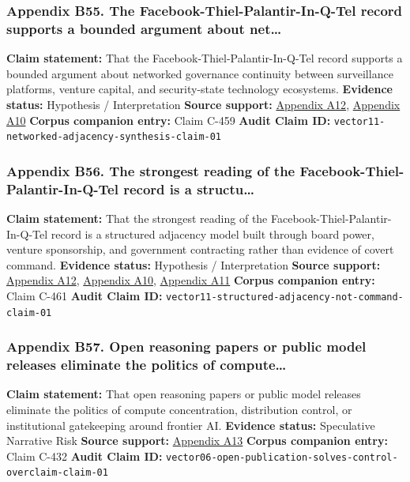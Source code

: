 \documentclass[
  american,
  11pt,
  letterpaper,
]{article}
\begin{document}
\subsubsection{Appendix B55. The Facebook-Thiel-Palantir-In-Q-Tel record
supports a bounded argument about
net\ldots{}}\label{appendix-b55-the-facebook-thiel-palantir-in-q-tel-record-supports-a-bounded-argument-about-net}

\textbf{Claim statement:} That the Facebook-Thiel-Palantir-In-Q-Tel
record supports a bounded argument about networked governance continuity
between surveillance platforms, venture capital, and security-state
technology ecosystems. \textbf{Evidence status:} Hypothesis /
Interpretation \textbf{Source support:}
\hyperref[appendix-a12-meta-platforms-inc-2022-definitive-proxy-statement]{Appendix
A12}, \hyperref[appendix-a10-in-q-tel]{Appendix A10} \textbf{Corpus
companion entry:} Claim C-459 \textbf{Audit Claim ID:}
\texttt{vector11-networked-adjacency-synthesis-claim-01}

\subsubsection{Appendix B56. The strongest reading of the
Facebook-Thiel-Palantir-In-Q-Tel record is a
structu\ldots{}}\label{appendix-b56-the-strongest-reading-of-the-facebook-thiel-palantir-in-q-tel-record-is-a-structu}

\textbf{Claim statement:} That the strongest reading of the
Facebook-Thiel-Palantir-In-Q-Tel record is a structured adjacency model
built through board power, venture sponsorship, and government
contracting rather than evidence of covert command. \textbf{Evidence
status:} Hypothesis / Interpretation \textbf{Source support:}
\hyperref[appendix-a12-meta-platforms-inc-2022-definitive-proxy-statement]{Appendix
A12}, \hyperref[appendix-a10-in-q-tel]{Appendix A10},
\hyperref[appendix-a11-gotham]{Appendix A11} \textbf{Corpus companion
entry:} Claim C-461 \textbf{Audit Claim ID:}
\texttt{vector11-structured-adjacency-not-command-claim-01}

\subsubsection{Appendix B57. Open reasoning papers or public model
releases eliminate the politics of
compute\ldots{}}\label{appendix-b57-open-reasoning-papers-or-public-model-releases-eliminate-the-politics-of-compute}

\textbf{Claim statement:} That open reasoning papers or public model
releases eliminate the politics of compute concentration, distribution
control, or institutional gatekeeping around frontier AI.
\textbf{Evidence status:} Speculative Narrative Risk \textbf{Source
support:}
\hyperref[appendix-a13-deepseek-r1-incentivizing-reasoning-capability-in-llms-via-reinforcement-learning]{Appendix
A13} \textbf{Corpus companion entry:} Claim C-432 \textbf{Audit Claim
ID:}
\texttt{vector06-open-publication-solves-control-overclaim-claim-01}
\end{document}
